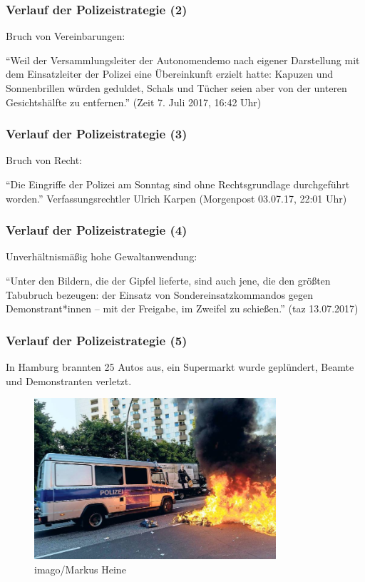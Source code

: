 \documentclass[]{beamer}
\begin{document}
	\begin{frame}
	\frametitle{Verlauf der Polizeistrategie (2)}
	Bruch von Vereinbarungen:\par 
	\enquote{Weil der Versammlungsleiter der Autonomendemo nach eigener Darstellung mit dem Einsatzleiter der Polizei eine Übereinkunft erzielt hatte: Kapuzen und Sonnenbrillen würden geduldet, Schals und Tücher seien aber von der unteren Gesichtshälfte zu entfernen.} (Zeit 7. Juli 2017, 16:42 Uhr)
\end{frame}

	\begin{frame}
	\frametitle{Verlauf der Polizeistrategie (3)}
	Bruch von Recht:\par 
	\enquote{Die Eingriffe der Polizei am Sonntag sind ohne Rechtsgrundlage durchgeführt worden.} Verfassungsrechtler Ulrich Karpen (Morgenpost 03.07.17, 22:01 Uhr)
\end{frame}

	\begin{frame}
	\frametitle{Verlauf der Polizeistrategie (4)}
	Unverhältnismäßig hohe Gewaltanwendung:\par 
	\enquote{Unter den Bildern, die der Gipfel lieferte, sind auch jene, die den größten Tabubruch bezeugen: der Einsatz von Sondereinsatzkommandos gegen Demonstrant*innen – mit der Freigabe, im Zweifel zu schießen.} (taz 13.07.2017)
\end{frame}

	\begin{frame}
	\frametitle{Verlauf der Polizeistrategie (5)}
		In Hamburg brannten 25 Autos aus, ein Supermarkt wurde geplündert, Beamte und Demonstranten verletzt.
	\begin{figure}
		\renewcommand{\figurename}{Foto} 
		\includegraphics[width=0.8\textwidth]{images/polizeistrategie1.jpg}
		\caption{imago/Markus Heine}
	\end{figure}
\end{frame}
\end{document}
